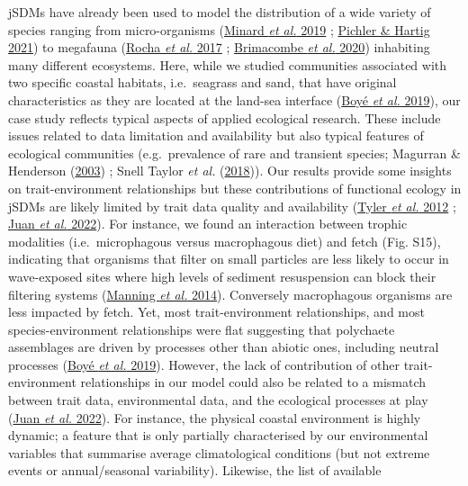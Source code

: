 \documentclass[9pt,biorxiv,doublespacing,lineno]{lapreprint}
\begin{document}
jSDMs have already been used to model the distribution of a wide variety
of species ranging from micro-organisms
(\protect\hyperlink{ref-Minard_2019}{Minard \emph{et al.} 2019} ;
\protect\hyperlink{ref-Pichler_2021}{Pichler \& Hartig 2021}) to
megafauna (\protect\hyperlink{ref-Rocha_2017}{Rocha \emph{et al.} 2017}
; \protect\hyperlink{ref-Brimacombe_2020}{Brimacombe \emph{et al.}
2020}) inhabiting many different ecosystems. Here, while we studied
communities associated with two specific coastal habitats, i.e.~seagrass
and sand, that have original characteristics as they are located at the
land-sea interface (\protect\hyperlink{ref-Boye_2019a}{Boyé \emph{et
al.} 2019}), our case study reflects typical aspects of applied
ecological research. These include issues related to data limitation and
availability but also typical features of ecological communities
(e.g.~prevalence of rare and transient species; Magurran \& Henderson
(\protect\hyperlink{ref-Magurran_2003}{2003}) ; Snell Taylor \emph{et
al.} (\protect\hyperlink{ref-SnellTaylor_2018}{2018})). Our results
provide some insights on trait-environment relationships but these
contributions of functional ecology in jSDMs are likely limited by trait
data quality and availability (\protect\hyperlink{ref-Tyler_2012}{Tyler
\emph{et al.} 2012} ; \protect\hyperlink{ref-deJuan_2022}{Juan \emph{et
al.} 2022}). For instance, we found an interaction between trophic
modalities (i.e.~microphagous versus macrophagous diet) and fetch (Fig.
S15), indicating that organisms that filter on small particles are less
likely to occur in wave-exposed sites where high levels of sediment
resuspension can block their filtering systems
(\protect\hyperlink{ref-Manning_2014}{Manning \emph{et al.} 2014}).
Conversely macrophagous organisms are less impacted by fetch. Yet, most
trait-environment relationships, and most species-environment
relationships were flat suggesting that polychaete assemblages are
driven by processes other than abiotic ones, including neutral processes
(\protect\hyperlink{ref-Boye_2019a}{Boyé \emph{et al.} 2019}). However,
the lack of contribution of other trait-environment relationships in our
model could also be related to a mismatch between trait data,
environmental data, and the ecological processes at play
(\protect\hyperlink{ref-deJuan_2022}{Juan \emph{et al.} 2022}). For
instance, the physical coastal environment is highly dynamic; a feature
that is only partially characterised by our environmental variables that
summarise average climatological conditions (but not extreme events or
annual/seasonal variability). Likewise, the list of available
\end{document}
